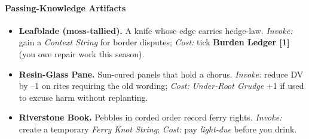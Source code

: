 \documentclass[11pt]{article}
\begin{document}
\paragraph{Passing-Knowledge Artifacts}
\begin{itemize}[leftmargin=*]
  \item \textbf{Leafblade (moss-tallied).} A knife whose edge carries hedge-law. \emph{Invoke:} gain a \emph{Context String} for border disputes; \emph{Cost:} tick \textbf{Burden Ledger [1]} (you owe repair work this season).
  \item \textbf{Resin-Glass Pane.} Sun-cured panels that hold a chorus. \emph{Invoke:} reduce DV by --1 on rites requiring the old wording; \emph{Cost:} \emph{Under-Root Grudge} +1 if used to excuse harm without replanting.
  \item \textbf{Riverstone Book.} Pebbles in corded order record ferry rights. \emph{Invoke:} create a temporary \emph{Ferry Knot String}; \emph{Cost:} pay \emph{light-due} before you drink.
\end{itemize}
\end{document}
